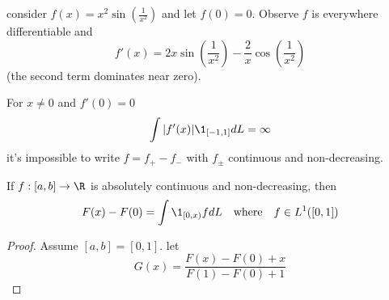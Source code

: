 \begin{example}
	consider $f(x) = x^{2} \sin(\frac{1}{x^2})$ and let $f(0) = 0$.
	Observe $f$ is everywhere differentiable and
	\[
		f'(x) = 2x \sin(\frac{1}{x^{2}}) - \frac{2}{x} \cos(\frac{1}{x^2})
	\] (the second term dominates near zero).

	For $x \neq 0$ and $f'(0) = 0$
	\[
		\int | f'(x) | \1_{[-1, 1]} dL = \infty
	\] 
	it's impossible to write $f = f_{+} - f_{-}$ with $f_{\pm}$ continuous and non-decreasing.
\end{example}


\begin{lemma}
	If $f : [a,b] \to \R$ is absolutely continuous and non-decreasing, then
	\begin{align*}
		F(x) - F(0) = \int \1_{[0,x)} f dL \quad \text{where} \quad f \in L^1 ([0,1])
	\end{align*} 
\end{lemma}

\begin{proof}
	Assume $[a,b] = [0,1]$.
	let
	 \[
		G(x) = \frac{F(x) - F(0) + x}{F(1) - F(0) + 1}
	\] 
\end{proof}




